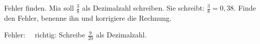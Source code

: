 \begin{aufgabe}{Fehler finden. Mia soll $\frac{3}{8}$ als Dezimalzahl schreiben. Sie schreibt: $\frac{3}{8} = 0{,}38$. Finde den Fehler, benenne ihn und korrigiere die Rechnung.}
\begin{teile}
\teil Fehler: \dsleer\dsleer\dsleer\dsleer\ \ richtig: \leerfeld
\teil Schreibe $\frac{9}{20}$ als Dezimalzahl. \leerfeld
\end{teile}
\end{aufgabe}
